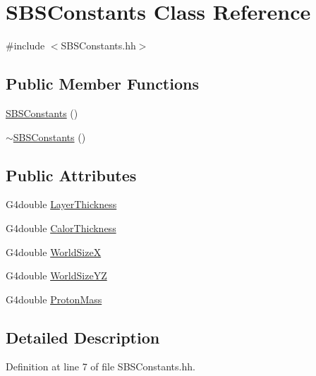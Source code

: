 \hypertarget{class_s_b_s_constants}{\section{S\-B\-S\-Constants Class Reference}
\label{class_s_b_s_constants}
}


{\ttfamily \#include $<$S\-B\-S\-Constants.\-hh$>$}

\subsection*{Public Member Functions}
\begin{DoxyCompactItemize}
\item 
\hyperlink{class_s_b_s_constants_a049342309ed8be5bb9d9cbc761666e96}{S\-B\-S\-Constants} ()
\item 
\hyperlink{class_s_b_s_constants_ad4f98882743d06d212fccfc94a4626da}{$\sim$\-S\-B\-S\-Constants} ()
\end{DoxyCompactItemize}
\subsection*{Public Attributes}
\begin{DoxyCompactItemize}
\item 
G4double \hyperlink{class_s_b_s_constants_a29bf41467669a48826fb1bca3011820f}{Layer\-Thickness}
\item 
G4double \hyperlink{class_s_b_s_constants_a3cae081cf9c23144407404b801c21cf7}{Calor\-Thickness}
\item 
G4double \hyperlink{class_s_b_s_constants_a9b72c9889cfe808ce1d54dae2968f776}{World\-Size\-X}
\item 
G4double \hyperlink{class_s_b_s_constants_a8a08daf887918c2a3420c46b8adb17f0}{World\-Size\-Y\-Z}
\item 
G4double \hyperlink{class_s_b_s_constants_a88d873c312dc69a76d5e8b2c0f08ec25}{Proton\-Mass}
\end{DoxyCompactItemize}


\subsection{Detailed Description}


Definition at line 7 of file S\-B\-S\-Constants.\-hh.



